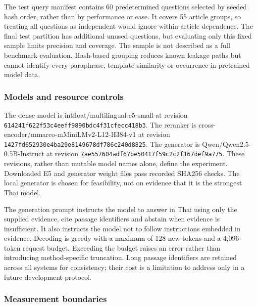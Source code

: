 \documentclass[10pt,a4paper]{article}
\begin{document}
The test query manifest contains 60 predetermined questions selected by
seeded hash order, rather than by performance or ease. It covers 55
article groups, so treating all questions as independent would ignore
within-article dependence. The final test partition has additional
unused questions, but evaluating only this fixed sample limits precision
and coverage. The sample is not described as a full benchmark
evaluation. Hash-based grouping reduces known leakage paths but cannot
identify every paraphrase, template similarity or occurrence in
pretrained model data.

\hypertarget{models-and-resource-controls}{%
\subsubsection{Models and resource
controls}\label{models-and-resource-controls}}

The dense model is intfloat/multilingual-e5-small at revision
\texttt{614241f6\allowbreak{}22f53c4e\allowbreak{}eff9890b\allowbreak{}dc4f31cf\allowbreak{}ecc418b3}. The reranker is
cross-encoder/mmarco-mMiniLMv2-L12-H384-v1 at revision
\texttt{1427fd65\allowbreak{}2930e4ba\allowbreak{}29e81496\allowbreak{}78df786c\allowbreak{}240d8825}. The generator is
Qwen/Qwen2.5-0.5B-Instruct at revision
\texttt{7ae55760\allowbreak{}4adf67be\allowbreak{}50417f59\allowbreak{}c2c2f167\allowbreak{}def9a775}. These revisions,
rather than mutable model names alone, define the experiment. Downloaded
E5 and generator weight files pass recorded SHA256 checks. The local
generator is chosen for feasibility, not on evidence that it is the
strongest Thai model.

The generation prompt instructs the model to answer in Thai using only
the supplied evidence, cite passage identifiers and abstain when
evidence is insufficient. It also instructs the model not to follow
instructions embedded in evidence. Decoding is greedy with a maximum of
128 new tokens and a 4,096-token request budget. Exceeding the budget
raises an error rather than introducing method-specific truncation. Long
passage identifiers are retained across all systems for consistency;
their cost is a limitation to address only in a future development
protocol.

\hypertarget{measurement-boundaries}{%
\subsubsection{Measurement boundaries}\label{measurement-boundaries}}
\end{document}
